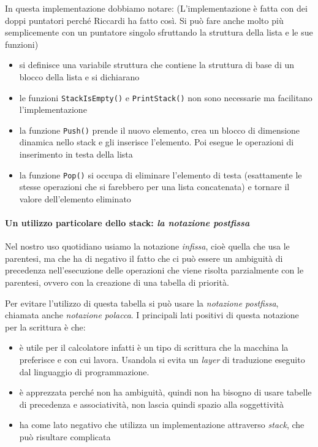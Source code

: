 \documentclass[
]{article}
\begin{document}
In questa implementazione dobbiamo notare: (L'implementazione è fatta
con dei doppi puntatori perché Riccardi ha fatto così. Si può fare anche
molto più semplicemente con un puntatore singolo sfruttando la struttura
della lista e le sue funzioni)

\begin{itemize}
\item
  si definisce una variabile struttura che contiene la struttura di base
  di un blocco della lista e si dichiarano
\item
  le funzioni \texttt{StackIsEmpty()} e \texttt{PrintStack()} non sono
  necessarie ma facilitano l'implementazione
\item
  la funzione \texttt{Push()} prende il nuovo elemento, crea un blocco
  di dimensione dinamica nello stack e gli inserisce l'elemento. Poi
  esegue le operazioni di inserimento in testa della lista
\item
  la funzione \texttt{Pop()} si occupa di eliminare l'elemento di testa
  (esattamente le stesse operazioni che si farebbero per una lista
  concatenata) e tornare il valore dell'elemento eliminato
\end{itemize}

\hypertarget{header-n1380}{%
\paragraph{\texorpdfstring{Un utilizzo particolare dello stack: \emph{la
notazione
postfissa}}{Un utilizzo particolare dello stack: la notazione postfissa}}\label{header-n1380}}

Nel nostro uso quotidiano usiamo la notazione \emph{infissa}, cioè
quella che usa le parentesi, ma che ha di negativo il fatto che ci può
essere un ambiguità di precedenza nell'esecuzione delle operazioni che
viene risolta parzialmente con le parentesi, ovvero con la creazione di
una tabella di priorità.

Per evitare l'utilizzo di questa tabella si può usare la \emph{notazione
postfissa}, chiamata anche \emph{notazione polacca}. I principali lati
positivi di questa notazione per la scrittura è che:

\begin{itemize}
\item
  è utile per il calcolatore infatti è un tipo di scrittura che la
  macchina la preferisce e con cui lavora. Usandola si evita un
  \emph{layer} di traduzione eseguito dal linguaggio di programmazione.
\item
  è apprezzata perché non ha ambiguità, quindi non ha bisogno di usare
  tabelle di precedenza e associatività, non lascia quindi spazio alla
  soggettività
\item
  ha come lato negativo che utilizza un implementazione attraverso
  \emph{stack}, che può risultare complicata
\end{itemize}
\end{document}
